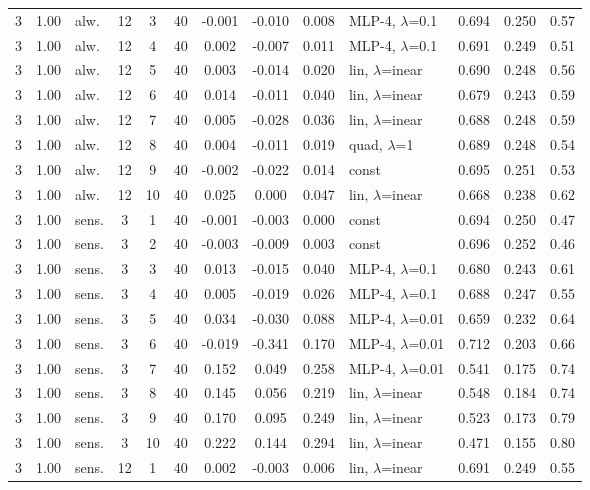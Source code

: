 \begin{scriptsize}
\begin{longtable}{cclcc c ccc l ccc}
3 & 1.00 & alw. & 12 & 3 & 40 & -0.001 & -0.010 & 0.008 & MLP-4, $\lambda$=0.1 & 0.694 & 0.250 & 0.57 \\
3 & 1.00 & alw. & 12 & 4 & 40 & 0.002 & -0.007 & 0.011 & MLP-4, $\lambda$=0.1 & 0.691 & 0.249 & 0.51 \\
3 & 1.00 & alw. & 12 & 5 & 40 & 0.003 & -0.014 & 0.020 & lin, $\lambda$=inear & 0.690 & 0.248 & 0.56 \\
3 & 1.00 & alw. & 12 & 6 & 40 & 0.014 & -0.011 & 0.040 & lin, $\lambda$=inear & 0.679 & 0.243 & 0.59 \\
3 & 1.00 & alw. & 12 & 7 & 40 & 0.005 & -0.028 & 0.036 & lin, $\lambda$=inear & 0.688 & 0.248 & 0.59 \\
3 & 1.00 & alw. & 12 & 8 & 40 & 0.004 & -0.011 & 0.019 & quad, $\lambda$=1 & 0.689 & 0.248 & 0.54 \\
3 & 1.00 & alw. & 12 & 9 & 40 & -0.002 & -0.022 & 0.014 & const & 0.695 & 0.251 & 0.53 \\
3 & 1.00 & alw. & 12 & 10 & 40 & 0.025 & 0.000 & 0.047 & lin, $\lambda$=inear & 0.668 & 0.238 & 0.62 \\
3 & 1.00 & sens. & 3 & 1 & 40 & -0.001 & -0.003 & 0.000 & const & 0.694 & 0.250 & 0.47 \\
3 & 1.00 & sens. & 3 & 2 & 40 & -0.003 & -0.009 & 0.003 & const & 0.696 & 0.252 & 0.46 \\
3 & 1.00 & sens. & 3 & 3 & 40 & 0.013 & -0.015 & 0.040 & MLP-4, $\lambda$=0.1 & 0.680 & 0.243 & 0.61 \\
3 & 1.00 & sens. & 3 & 4 & 40 & 0.005 & -0.019 & 0.026 & MLP-4, $\lambda$=0.1 & 0.688 & 0.247 & 0.55 \\
3 & 1.00 & sens. & 3 & 5 & 40 & 0.034 & -0.030 & 0.088 & MLP-4, $\lambda$=0.01 & 0.659 & 0.232 & 0.64 \\
3 & 1.00 & sens. & 3 & 6 & 40 & -0.019 & -0.341 & 0.170 & MLP-4, $\lambda$=0.01 & 0.712 & 0.203 & 0.66 \\
3 & 1.00 & sens. & 3 & 7 & 40 & 0.152 & 0.049 & 0.258 & MLP-4, $\lambda$=0.01 & 0.541 & 0.175 & 0.74 \\
3 & 1.00 & sens. & 3 & 8 & 40 & 0.145 & 0.056 & 0.219 & lin, $\lambda$=inear & 0.548 & 0.184 & 0.74 \\
3 & 1.00 & sens. & 3 & 9 & 40 & 0.170 & 0.095 & 0.249 & lin, $\lambda$=inear & 0.523 & 0.173 & 0.79 \\
3 & 1.00 & sens. & 3 & 10 & 40 & 0.222 & 0.144 & 0.294 & lin, $\lambda$=inear & 0.471 & 0.155 & 0.80 \\
3 & 1.00 & sens. & 12 & 1 & 40 & 0.002 & -0.003 & 0.006 & lin, $\lambda$=inear & 0.691 & 0.249 & 0.55 \\

\end{longtable}
\end{scriptsize}
